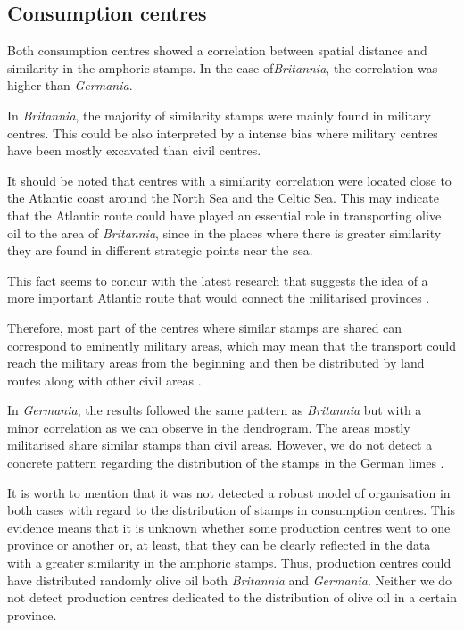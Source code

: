 \documentclass[review]{elsarticle}
\begin{document}
\subsection{Consumption centres}

Both consumption centres showed a correlation between spatial distance and similarity in the amphoric stamps. In the case of\textit{Britannia}, the correlation was higher than \textit{Germania}.

In \textit{Britannia}, the majority of similarity stamps were mainly found in military centres. This could be also interpreted by a intense bias where military centres have been mostly excavated than civil centres. 

It should be noted that centres with a similarity correlation were located close to the Atlantic coast around the North Sea and the Celtic Sea. This may indicate that the Atlantic route could have played an essential role in transporting olive oil to the area of \textit{Britannia}, since in the places where there is greater similarity they are found in different strategic points near the sea.

This fact seems to concur with the latest research that suggests the idea of a more important Atlantic route that would connect the militarised provinces \citep{remesal_annona_1986,
remesal_provincial_2008,
carreras_atlantic_2012,
morillo_hispania_2016,rubio-campillo_provincias_2018}.

Therefore, most part of the centres where similar stamps are shared can correspond to eminently military areas, which may mean that the transport could reach the military areas from the beginning and then be distributed by land routes along with other civil areas \citep{carreras_britannia_1998,
ayllon_olive_2018}.

In \textit{Germania}, the results followed the same pattern as \textit{Britannia} but with a minor correlation as we can observe in the dendrogram. The areas mostly militarised share similar stamps than civil areas. However, we do not detect a concrete pattern regarding the distribution of the stamps in the German limes \citep{xanten2018}. 

It is worth to mention that it was not detected a robust model of organisation in both cases with regard to the distribution of stamps in consumption centres. This evidence means that it is unknown whether some production centres went to one province or another or, at least, that they can be clearly reflected in the data with a greater similarity in the amphoric stamps. Thus, production centres could have distributed randomly olive oil both \textit{Britannia} and \textit{Germania}. Neither we do not detect production centres dedicated to the distribution of olive oil in a certain province. 
\end{document}
